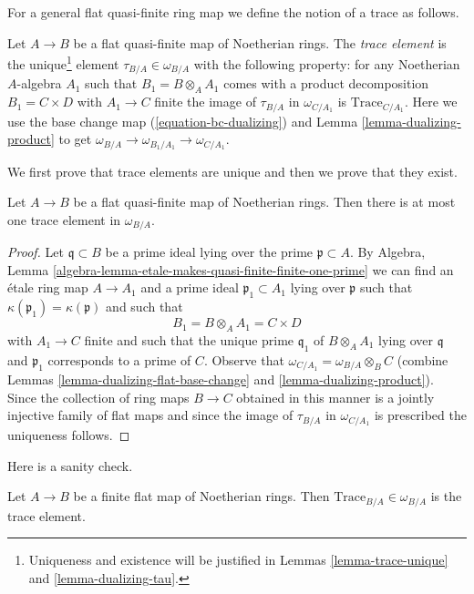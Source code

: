 \medskip\noindent
For a general flat quasi-finite ring map we define the notion
of a trace as follows.

\begin{definition}
\label{definition-trace-element}
Let $A \to B$ be a flat quasi-finite map of Noetherian rings.
The {\it trace element} is the unique\footnote{Uniqueness
and existence will be justified in
Lemmas \ref{lemma-trace-unique} and \ref{lemma-dualizing-tau}.}
element
$\tau_{B/A} \in \omega_{B/A}$
with the following property: for any Noetherian $A$-algebra $A_1$
such that $B_1 = B \otimes_A A_1$ comes with a
product decomposition $B_1 = C \times D$ with $A_1 \to C$ finite
the image of $\tau_{B/A}$ in $\omega_{C/A_1}$
is $\text{Trace}_{C/A_1}$.
Here we use the base change map (\ref{equation-bc-dualizing}) and
Lemma \ref{lemma-dualizing-product} to get
$\omega_{B/A} \to \omega_{B_1/A_1} \to \omega_{C/A_1}$.
\end{definition}

\noindent
We first prove that trace elements are unique and then
we prove that they exist.

\begin{lemma}
\label{lemma-trace-unique}
Let $A \to B$ be a flat quasi-finite map of Noetherian rings.
Then there is at most one trace element in $\omega_{B/A}$.
\end{lemma}

\begin{proof}
Let $\mathfrak q \subset B$ be a prime ideal lying over the prime
$\mathfrak p \subset A$. By
Algebra, Lemma \ref{algebra-lemma-etale-makes-quasi-finite-finite-one-prime}
we can find an \'etale ring map $A \to A_1$ and a prime
ideal $\mathfrak p_1 \subset A_1$ lying over $\mathfrak p$
such that $\kappa(\mathfrak p_1) = \kappa(\mathfrak p)$ and
such that
$$
B_1 = B \otimes_A A_1 = C \times D
$$
with $A_1 \to C$ finite and such that the unique prime $\mathfrak q_1$
of $B \otimes_A A_1$ lying over $\mathfrak q$ and $\mathfrak p_1$
corresponds to a prime of $C$. Observe that
$\omega_{C/A_1} = \omega_{B/A} \otimes_B C$
(combine Lemmas \ref{lemma-dualizing-flat-base-change} and
\ref{lemma-dualizing-product}). Since the collection
of ring maps $B \to C$ obtained in this manner is a jointly
injective family of flat maps and since the image of $\tau_{B/A}$
in $\omega_{C/A_1}$ is prescribed the uniqueness follows.
\end{proof}

\noindent
Here is a sanity check.

\begin{lemma}
\label{lemma-finite-flat-trace}
Let $A \to B$ be a finite flat map of Noetherian rings.
Then $\text{Trace}_{B/A} \in \omega_{B/A}$ is the trace element.
\end{lemma}

